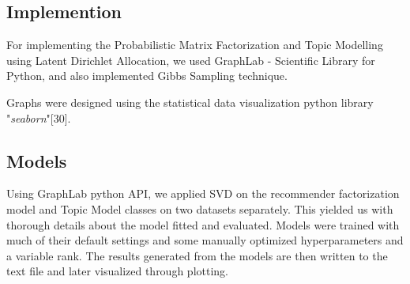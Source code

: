 \begin{figure}
  {\par}
\end{figure}

\subsection{Implemention}
For implementing the Probabilistic Matrix Factorization and Topic Modelling using Latent Dirichlet Allocation, we used GraphLab - Scientific Library for Python, and also implemented Gibbs Sampling technique.

Graphs were designed using the statistical data visualization python library "\textit{seaborn}"[30].

\subsection{Models}
Using GraphLab python API, we applied SVD on the recommender factorization model and Topic Model classes on two datasets separately. This yielded us with thorough details about the model fitted and evaluated. Models were trained with much of their default settings and some manually optimized hyperparameters and a variable rank. The results generated from the models are then written to the text file and later visualized through plotting.

